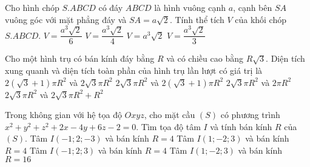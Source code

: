 \begin{ex}%
	Cho hình chóp $S.ABCD$ có đáy $ABCD$ là hình vuông cạnh $a$, cạnh bên $SA$ vuông góc với mặt phẳng đáy và $SA=a\sqrt 2$. Tính thể tích $V$ của khối chóp $S.ABCD$.
	\choice
	{$V=\dfrac{a^3\sqrt 2}{6}$}
	{$V=\dfrac{a^3\sqrt 2}{4}$}
	{$V=a^3\sqrt 2$}
	{\True $V=\dfrac{a^3\sqrt 2}{3}$}
\end{ex}

\begin{ex}%
	Cho một hình trụ có bán kính đáy bằng $R$ và có chiều cao bằng $R\sqrt 3$. Diện tích xung quanh và diện tích toàn phần của hình trụ lần lượt có giá trị là
	\choice
	{$2\left(\sqrt 3+1\right)\pi R^2$ và $2\sqrt 3\pi R^2$}
	{\True $2\sqrt 3\pi R^2$ và $2\left(\sqrt 3+1\right)\pi R^2$}
	{$2\sqrt 3\pi R^2$ và $2\pi R^2$}
	{$2\sqrt 3\pi R^2$ và $2\sqrt 3\pi R^2+R^2$}
\end{ex}

\begin{ex}%
	Trong không gian với hệ tọa độ $Oxyz$, cho mặt cầu $(S)$ có phương trình $x^2+y^2+z^2+2x-4y+6z-2=0$. Tìm tọa độ tâm $I$ và tính bán kính $R$ của $(S)$.
	\choice
	{\True Tâm $I(-1;2;-3)$ và bán kính $R=4$}
	{Tâm $I(1;-2;3)$ và bán kính $R=4$}
	{Tâm $I(-1;2;3)$ và bán kính $R=4$}
	{Tâm $I(1;-2;3)$ và bán kính $R=16$}
\end{ex}

